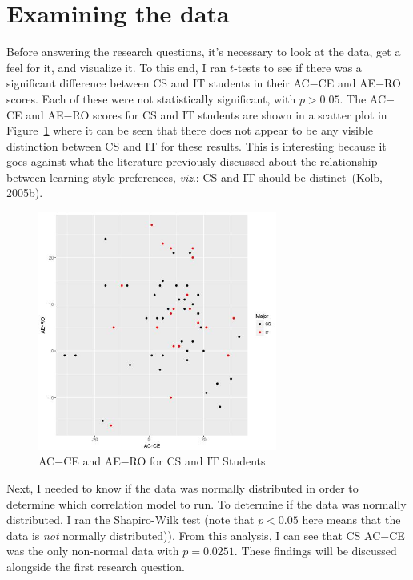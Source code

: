 \section{Examining the data}
Before answering the research questions, it's necessary to look at the data, get a feel for it, and visualize it. To this end, I ran $t$-tests to see if there was a significant difference between CS and IT students in their AC$-$CE and AE$-$RO scores. Each of these were not statistically significant, with $p>0.05$. The AC$-$CE and AE$-$RO scores for CS and IT students are shown in a scatter plot in Figure~\ref{fig:c-cs-v-it-plot} where it can be seen that there does not appear to be any visible distinction between CS and IT for these results. This is interesting because it goes against what the literature previously discussed about the relationship between learning style preferences, \textit{viz}.: CS and IT should be distinct~(Kolb, 2005b).

\begin{figure}[!bhtb]
  \centering
  \includegraphics[width=0.7\textwidth]{figures/chapter4/cs-v-it-plot.jpg}
  \caption[AC$-$CE and AE$-$RO for CS and IT Students]{AC$-$CE and AE$-$RO for CS and IT Students}
  \label{fig:c-cs-v-it-plot}
\end{figure}

Next, I needed to know if the data was normally distributed in order to determine which correlation model to run. To determine if the data was normally distributed, I ran the Shapiro-Wilk test (note that $p<0.05$ here means that the data is \emph{not} normally distributed)). From this analysis, I can see that CS AC$-$CE was the only non-normal data with $p=0.0251$. These findings will be discussed alongside the first research question.

